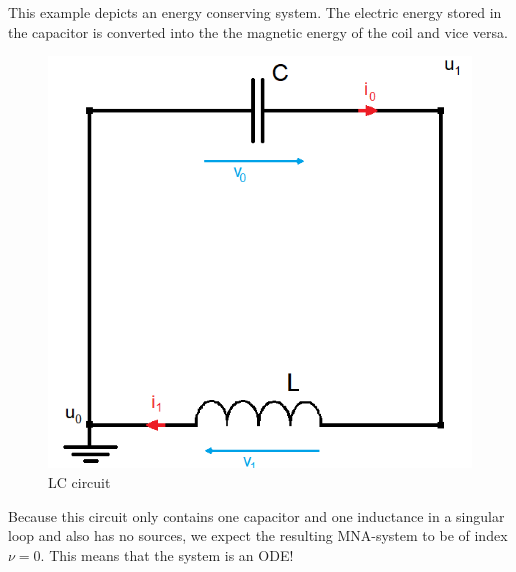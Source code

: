 	
\begin{example2}
	This example depicts an energy conserving system. The electric energy stored in the capacitor is converted into the the magnetic energy of the coil and vice versa.
	\begin{figure}[H]
		\centering
		\includegraphics[scale = 0.4]{pictures/Example2_index0.png}
		\caption{LC circuit}
	\end{figure}
	Because this circuit only contains one capacitor and one inductance in a singular loop and also has no sources, we expect the resulting MNA-system to be of index $\nu=0$. This means that the system is an ODE!
	

\end{example2}
